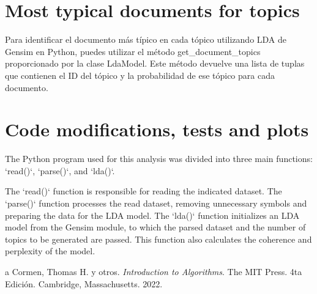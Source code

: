 \documentclass[10pt]{article} %
\begin{document}
	\section{Most typical documents for topics}
	Para identificar el documento más típico en cada tópico utilizando LDA de Gensim en Python, puedes utilizar el método get\_document\_topics proporcionado por la clase LdaModel. Este método devuelve una lista de tuplas que contienen el ID del tópico y la probabilidad de ese tópico para cada documento.
	
	
	\section{Code modifications, tests and plots}
	
	The Python program used for this analysis was divided into three main functions: `read()`, `parse()`, and `lda()`.
	
	The `read()` function is responsible for reading the indicated dataset. The `parse()` function processes the read dataset, removing unnecessary symbols and preparing the data for the LDA model. The `lda()` function initializes an LDA model from the Gensim module, to which the parsed dataset and the number of topics to be generated are passed. This function also calculates the coherence and perplexity of the model.
	
	
	\begin{thebibliography}
		a
		 Cormen, Thomas H. y otros. \emph{Introduction to Algorithms}. 
		The MIT Press.
		4ta Edici\'on.		
		Cambridge, Massachusetts.
		2022.
	\end{thebibliography}
\end{document}
